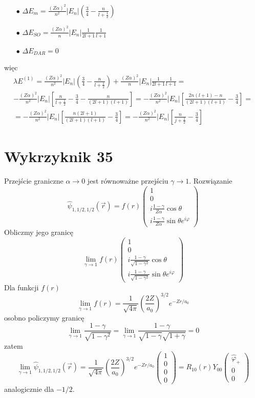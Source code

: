 \documentclass[a4paper,12pt]{article}
\begin{document}
\begin{enumerate}
 				\begin{itemize}
 					\item[$\bullet$]  $\Delta E_m = \frac{(Z\alpha)^2}{n^2}|E_n|\left(\frac{3}{4}  -\frac{n}{l+\frac{1}{2}}\right) $
 					\item[$\bullet$]  $\Delta E_{SO} = \frac{(Z\alpha)^2}{n}|E_n|\frac{1}{2l+1} \frac{1}{l+1}$
 					\item[$\bullet$]  $\Delta E_{DAR} = 0 $
 				\end{itemize}
 				więc
 				$$
 				\begin{gathered}
 					\lambda E^{(1)} =  \frac{(Z\alpha)^2}{n^2}|E_n|\left(\frac{3}{4}  -\frac{n}{l+\frac{1}{2}}\right) +  \frac{(Z\alpha)^2}{n}|E_n|\frac{1}{2l+1} \frac{1}{l+1} =\\ -\frac{(Z\alpha)^2}{n^2}|E_n| \left[  \frac{n}{l+\frac{1}{2}} - \frac{3}{4} - \frac{n}{(2l+1)(l+1)}  \right] =-\frac{(Z\alpha)^2}{n^2}|E_n|
 					  \left[ \frac{2n(l+1) - n}{(2l+1)(l+1)} - \frac{3}{4} \right] = \\
 					  =-\frac{(Z\alpha)^2}{n^2}|E_n|\left[ \frac{n(2l+1)}{(2l+1)(l+1)} - \frac{3}{4} \right] = -\frac{(Z\alpha)^2}{n^2}|E_n|\left[ \frac{n}{j+\frac{1}{2}} - \frac{3}{4} \right] 
 				\end{gathered}
 				$$
		 \end{enumerate}
\section{Wykrzyknik 35}
	Przejście graniczne $\alpha \to 0$ jest równoważne przejściu $\gamma \to 1$. Rozwiązanie 
	$$
	\hat{\psi}_{1,1/2,1/2}(\vec{r}) = f(r)
		\begin{pmatrix}
			1 \\ 0 \\ i\frac{1-\gamma}{Z\alpha}\cos\theta \\ i\frac{1-\gamma}{Z\alpha}\sin\theta e^{i\varphi}
		\end{pmatrix}
	$$
	Obliczmy jego granicę
	$$
	\lim\limits_{\gamma\to 1} f(r)
	\begin{pmatrix}
		1 \\ 0 \\ i\frac{1-\gamma}{\sqrt{1-\gamma^2}}\cos\theta \\ i\frac{1-\gamma}{\sqrt{1-\gamma^2}}\sin\theta e^{i\varphi}
	\end{pmatrix}
	$$
	Dla funkcji $f(r)$
	$$
	\lim\limits_{\gamma\to 1}f(r) =\frac{1}{\sqrt{4\pi}}\left(\frac{2Z}{a_0}\right)^{3/2} e^{-Zr/a_0}
	$$
	osobno policzymy granicę
	$$
	\lim\limits_{\gamma\to 1}\frac{1-\gamma}{\sqrt{1-\gamma^2}} = \lim\limits_{\gamma\to 1}\frac{1-\gamma}{\sqrt{1-\gamma}\sqrt{1+\gamma}} = 0
	$$
	zatem
	$$
	\lim\limits_{\gamma\to 1}\hat{\psi}_{1,1/2,1/2}(\vec{r}) = \frac{1}{\sqrt{4\pi}}\left(\frac{2Z}{a_0}\right)^{3/2} e^{-Zr/a_0}
	\begin{pmatrix}
		1 \\ 0 \\ 0 \\ 0
	\end{pmatrix} = R_{10}(r) Y_{00}\begin{pmatrix}
	\hat{\varphi}_+ \\ 0 \\ 0
	\end{pmatrix}
	$$
	analogicznie dla $-1/2$.
\end{document}
